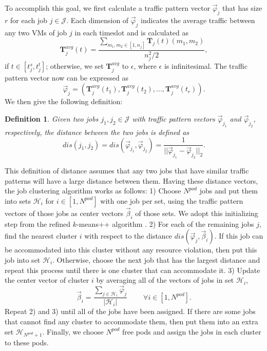 \documentclass[journal,single-space,two column,twoside,10pt]{IEEEtran}
\newtheorem{definition}{Definition}
\begin{document}
To accomplish this goal, we first calculate a traffic pattern vector $\vec{\varphi}_j$ that has size $r$ for each job $j \in \mathcal{J}$. Each dimension of $\vec{\varphi}_j$ indicates the average traffic between any two VMs of job $j$ in each timeslot and is calculated as
\begin{equation}
\mathbf{T}_j^{avg}(t) =
 \frac{\sum_{m_1,m_2 \in [1, n_j]}\mathbf{T}_j(t)(m_1,m_2)}{n_j^2 / 2},
\end{equation}
if $t\in [t_j^s,t_j^t]$; otherwise, we set $\mathbf{T}_j^{avg}$ to $\epsilon$, where $\epsilon$ is infinitesimal. The traffic pattern vector now can be expressed as
\begin{equation}
\vec{\varphi}_j = \left(\mathbf{T}_j^{avg}(t_1), \mathbf{T}_j^{avg}(t_2),...,\mathbf{T}_j^{avg}(t_{r})\right).
\end{equation}
We then give the following definition:
\begin{definition}
Given two jobs $j_1, j_2 \in \mathcal{J}$ with traffic pattern vectors $\vec{\varphi}_{j_1}$ and $\vec{\varphi}_{j_2}$, respectively, the distance between the two jobs is defined as
\begin{equation}
dis(j_1,j_2) = dis(\vec{\varphi}_{j_1}, \vec{\varphi}_{j_2}) = \frac{1}{||\vec{\varphi}_{j_1} - \vec{\varphi}_{j_2}||_2}.
\end{equation}
\end{definition}
This definition of distance assumes that any two jobs that have similar traffic patterns will have a large distance between them. Having these distance vectors, the job clustering algorithm works as follows: 1) Choose $N^{pod}$ jobs and put them into sets $\mathcal{H}_i$ for $i \in [1,N^{pod}]$ with one job per set, using the traffic pattern vectors of those jobs as center vectors $\vec{\beta}_i$ of those sets. We adopt this initializing step from the refined $k$-means++ algorithm \cite{Arthur_Vassilvitskii-2007}. 2) For each of the remaining jobs $j$, find the nearest cluster $i$ with respect to the distance $dis(\vec{\varphi}_j, \vec{\beta}_i)$. If this job can be accommodated into this cluster without any resource violation, then put this job into set $\mathcal{H}_i$. Otherwise, choose the next job that has the largest distance and repeat this process until there is one cluster that can accommodate it. 3) Update the center vector of cluster $i$ by averaging all of the vectors of jobs in set $\mathcal{H}_i$,
\begin{equation}
	\vec{\beta}_i = \frac{\sum_{j \in \mathcal{H}_i} \vec{\varphi}_j}{|\mathcal{H}_i|} \;\;\;\;\;\;\;\;\forall i \in [1,N^{pod}].
\end{equation}
Repeat 2) and 3) until all of the jobs have been assigned. If there are some jobs that cannot find any cluster to accommodate them, then put them into an extra set $\mathcal{H}_{N^{pod} + 1}$. Finally, we choose $N^{pod}$ free pods and assign the jobs in each cluster to these pods.
\end{document}
